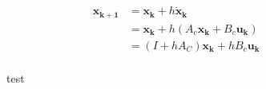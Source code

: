 \documentclass[11pt, a4paper, USenglish]{article} %
\renewcommand{\vec}[1]{\mathbf{#1}}
\newlength{\figureheight}
\newlength{\figurewidth}
\begin{document}
\begin{align*}
    \vec{x_{k+1}} &= \vec{x_k} + h\vec{\dot{x}_k} \\
                  &= \vec{x_k} + h(A_c\vec{x_k} + B_c \vec{u_k}) \\  
                  &= (I + hA_C)\vec{x_k} + hB_c \vec{u_k} \\  
\end{align*}

\begin{figure}[H] 
        \centering
        \setlength{\figureheight}{6cm}
        \setlength{\figurewidth}{10cm}
        
        \caption{test} 
\label{fig:figure1} 
\end{figure}
\end{document}
